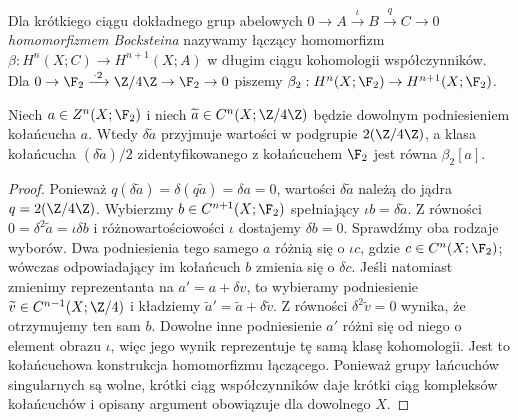 \begin{definicja}
Dla krótkiego ciągu dokładnego grup abelowych
$0\to A\xrightarrow{\iota}B\xrightarrow{q}C\to0$
\emph{homomorfizmem Bocksteina} nazywamy łączący homomorfizm
$\beta:H^n(X;C)\to H^{n+1}(X;A)$
w długim ciągu kohomologii współczynników.
Dla $0\to\F_2\xrightarrow{\,\cdot2\,}\Z/4\Z\to\F_2\to0$
piszemy $\beta_2:H^n(X;\F_2)\to H^{n+1}(X;\F_2)$.
\end{definicja}

\begin{stwierdzenie}
\label{prop:bockstein-v8}
Niech $a\in Z^n(X;\F_2)$ i niech $\widetilde a\in C^n(X;\Z/4\Z)$
będzie dowolnym podniesieniem kołańcucha $a$. Wtedy
$\delta\widetilde a$ przyjmuje wartości w podgrupie
$2(\Z/4\Z)$, a klasa kołańcucha
$(\delta\widetilde a)/2$ zidentyfikowanego z kołańcuchem
$\F_2$ jest równa $\beta_2[a]$.
\end{stwierdzenie}
\begin{proof}
Ponieważ $q(\delta\widetilde a)=\delta(q\widetilde a)=\delta a=0$,
wartości $\delta\widetilde a$ należą do jądra $q=2(\Z/4\Z)$.
Wybierzmy $b\in C^{n+1}(X;\F_2)$ spełniający
$\iota b=\delta\widetilde a$. Z równości
$0=\delta^2\widetilde a=\iota\delta b$ i różnowartościowości
$\iota$ dostajemy $\delta b=0$.
Sprawdźmy oba rodzaje wyborów. Dwa podniesienia tego samego $a$
różnią się o $\iota c$, gdzie $c\in C^n(X;\F_2)$;
wówczas odpowiadający im kołańcuch $b$ zmienia się o $\delta c$.
Jeśli natomiast zmienimy reprezentanta na $a'=a+\delta v$,
to wybieramy podniesienie $\widetilde v\in C^{n-1}(X;\Z/4)$
i kładziemy $\widetilde a'=\widetilde a+\delta\widetilde v$.
Z równości $\delta^2\widetilde v=0$ wynika, że otrzymujemy
ten sam $b$. Dowolne inne podniesienie $a'$ różni się
od niego o element obrazu $\iota$, więc jego wynik
reprezentuje tę samą klasę kohomologii. Jest to
kołańcuchowa konstrukcja homomorfizmu łączącego.
Ponieważ grupy łańcuchów singularnych są wolne,
krótki ciąg współczynników daje krótki ciąg kompleksów
kołańcuchów i opisany argument obowiązuje dla dowolnego $X$.
\end{proof}

